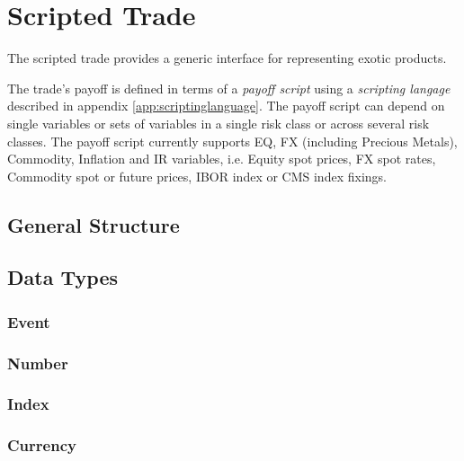\section{Scripted Trade}
\label{app:scriptedtrade}

The scripted trade provides a generic interface for representing exotic
products.  

The trade's payoff is defined in terms of a {\em payoff
script} using a {\em scripting langage} described in appendix
\ref{app:scriptinglanguage}.
The payoff script can depend on single variables or sets of
variables in a single risk class or across several risk classes. The
payoff script currently supports EQ, FX (including Precious Metals),
Commodity, Inflation and IR variables, i.e. Equity spot prices, FX spot rates,
Commodity spot or future prices, IBOR index or CMS index fixings.

\subsection{General Structure}\label{generalStructure}



\subsection{Data Types}\label{appDataNode}


\subsubsection{Event}


\subsubsection{Number}


\subsubsection{Index}\label{data_index}


\subsubsection{Currency}


